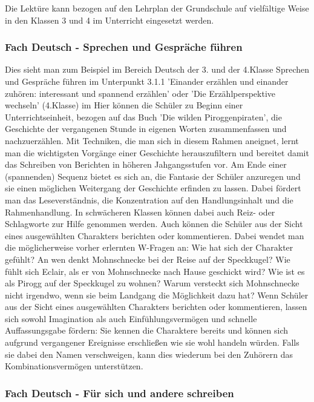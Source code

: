 {Die Lektüre kann bezogen auf den Lehrplan der Grundschule \cite{Lehrplan der Grundschule, Bayern 2000} auf vielfältige Weise in den Klassen 3 und 4 im Unterricht eingesetzt werden. 

\subsubsection{Fach Deutsch - Sprechen und Gespräche führen}

Dies sieht man zum Beispiel im Bereich Deutsch der 3. und der 4.Klasse Sprechen und Gespräche führen im Unterpunkt 3.1.1 'Einander erzählen und einander zuhören: interessant und spannend erzählen' oder 'Die Erzählperspektive wechseln' (4.Klasse) im\cite{Lehrplan der Grundschule, Bayern 2000} 
Hier können die Schüler zu Beginn einer Unterrichtseinheit, bezogen auf das Buch 'Die wilden Piroggenpiraten',\cite{pir} die Geschichte der vergangenen Stunde in eigenen Worten zusammenfassen und nachzuerzählen. Mit Techniken, die man sich in diesem Rahmen aneignet, lernt man die wichtigsten Vorgänge einer Geschichte herauszufiltern und  bereitet damit das Schreiben von Berichten in höheren Jahgangsstufen vor. 
Am Ende einer (spannenden) Sequenz bietet es sich an, die Fantasie der Schüler anzuregen und sie einen möglichen Weitergang der Geschichte erfinden zu lassen. Dabei fördert man das Leseverständnis, die Konzentration auf den Handlungsinhalt und die Rahmenhandlung. In schwächeren Klassen können dabei auch Reiz- oder Schlagworte zur Hilfe genommen werden. 
Auch können die Schüler aus der Sicht eines ausgewählten Charakters berichten oder kommentieren. Dabei wendet man die möglicherweise vorher erlernten W-Fragen an: Wie hat sich der Charakter gefühlt? An wen denkt Mohnschnecke bei der Reise auf der Speckkugel? Wie fühlt sich Eclair, als er von Mohnschnecke nach Hause geschickt wird? Wie ist es als Pirogg auf der Speckkugel zu wohnen? Warum versteckt sich Mohnschnecke nicht irgendwo, wenn sie beim Landgang die Möglichkeit dazu hat?
Wenn Schüler aus der Sicht eines ausgewählten Charakters berichten oder kommentieren, lassen sich sowohl Imagination als auch Einfühlungsvermögen und schnelle Auffassungsgabe fördern: Sie kennen die Charaktere bereits und können sich aufgrund vergangener Ereignisse erschließen wie sie wohl handeln würden. Falls sie dabei den Namen verschweigen, kann dies wiederum bei den Zuhörern das Kombinationsvermögen unterstützen.

\subsubsection{Fach Deutsch - Für sich und andere schreiben}

}
